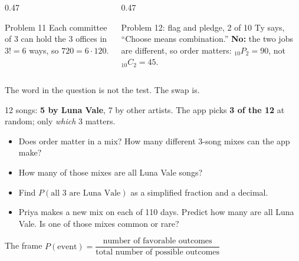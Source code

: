 \documentclass[aspectratio=169, 11pt]{beamer}
\newcommand{\redink}[1]{{\color{redacc}\bfseries #1}}
\newcommand{\Pnr}[2]{{}_{#1}P_{#2}}
\newcommand{\Cnr}[2]{{}_{#1}C_{#2}}
\begin{document}
\begin{frame}[t, plain]
  \vspace{4pt}
  \begin{columns}[t]
    \begin{column}{0.47\textwidth}
      \begin{block}{Problem 11}
        Each committee of 3 can hold the 3 offices in $3! = 6$ ways, so
        $720 = 6 \cdot 120$.
      \end{block}
    \end{column}
    \begin{column}{0.47\textwidth}
      \begin{block}{Problem 12: flag and pledge, 2 of 10}
        Ty says, ``Choose means combination.'' \redink{No:} the two jobs are different, so
        order matters: $\Pnr{10}{2} = 90$, not $\Cnr{10}{2} = 45$.
      \end{block}
    \end{column}
  \end{columns}
  \vspace{10pt}
  \begin{center}
    {\small\color{slate} The word in the question is not the test. The swap is.}
  \end{center}
\end{frame}

\begin{frame}[t, plain]
  \begin{center}
    12 songs: \textbf{5 by Luna Vale}, 7 by other artists. The app picks \textbf{3 of the 12}
    at random; only \emph{which} 3 matters.
  \end{center}
  \begin{itemize}\setlength{\itemsep}{4pt}
    \item[13.] Does order matter in a mix? How many different 3-song mixes can the app make?
    \item[14.] How many of those mixes are all Luna Vale songs?
    \item[15.] Find $P(\text{all 3 are Luna Vale})$ as a simplified fraction and a decimal.
    \item[16.] Priya makes a new mix on each of 110 days. Predict how many are all Luna Vale.
          Is one of those mixes common or rare?
  \end{itemize}
  \begin{block}{The frame}
    $P(\text{event}) = \dfrac{\text{number of favorable outcomes}}{\text{total number of possible outcomes}}$
  \end{block}
\end{frame}
\end{document}
